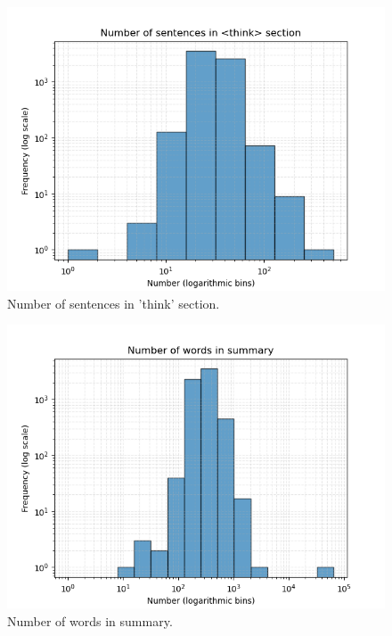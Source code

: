 \documentclass[conference]{IEEEtran}
\begin{document}
    \begin{figure}[htbp]
        \centerline{\includegraphics[width=\linewidth]{"./Number of sentences in <think> section.png"}}
        \caption{Number of sentences in 'think' section.}
        \label{fig}
        \end{figure}

        \begin{figure}[htbp]
            \centerline{\includegraphics[width=\linewidth]{"./Number of words in summary.png"}}
            \caption{Number of words in summary.}
            \label{fig}
            \end{figure}
\end{document}
